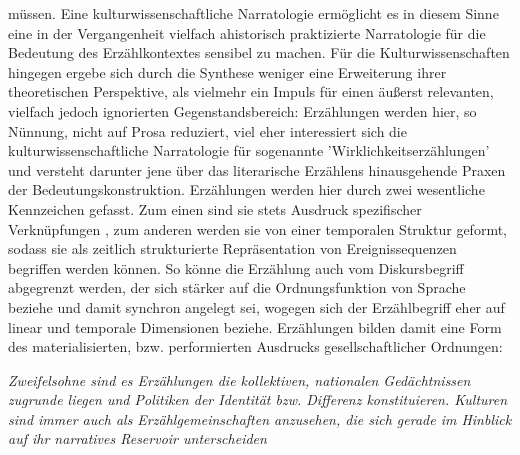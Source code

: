 müssen. Eine kulturwissenschaftliche Narratologie ermöglicht es in diesem Sinne
eine in der Vergangenheit vielfach ahistorisch praktizierte Narratologie für
die Bedeutung des Erzählkontextes sensibel zu machen. Für die
Kulturwissenschaften hingegen ergebe sich durch die Synthese weniger eine
Erweiterung ihrer theoretischen Perspektive, als vielmehr ein Impuls für einen
äußerst relevanten, vielfach jedoch ignorierten Gegenstandsbereich: Erzählungen
werden hier, so Nünnung, nicht auf Prosa reduziert, viel eher interessiert sich
die kulturwissenschaftliche Narratologie für sogenannte
'Wirklichkeitserzählungen' und versteht darunter jene über das literarische
Erzählens hinausgehende Praxen der Bedeutungskonstruktion. Erzählungen werden
hier durch zwei wesentliche Kennzeichen gefasst. Zum einen sind sie stets
Ausdruck \glqq spezifischer Verknüpfungen \grqq\footnotemark
{}, zum anderen werden sie von einer
\glqq temporalen Struktur \grqq\footnotemark {}  geformt, sodass sie als \glqq zeitlich strukturierte
Repräsentation von Ereignissequenzen\grqq\footnotemark {} begriffen werden können. So könne die
Erzählung auch vom Diskursbegriff abgegrenzt werden, der sich stärker auf die
Ordnungsfunktion von Sprache beziehe und damit synchron angelegt sei, wogegen
sich der Erzählbegriff eher auf linear und temporale Dimensionen
beziehe.\footnotemark {}
Erzählungen bilden damit eine Form des materialisierten, bzw. performierten
Ausdrucks gesellschaftlicher Ordnungen:
\begin{myenv}
  \textit{
  \glqq Zweifelsohne sind es Erzählungen die kollektiven, nationalen
  Gedächtnissen zugrunde liegen und Politiken der Identität bzw. Differenz
  konstituieren. Kulturen sind immer auch als Erzählgemeinschaften anzusehen,
  die sich gerade im Hinblick auf ihr narratives Reservoir unterscheiden \grqq\footnotemark {}
  } \end{myenv}


